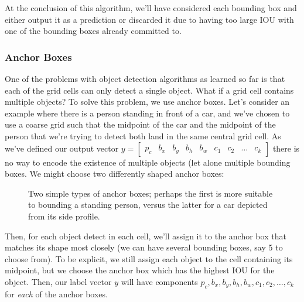 \documentclass[12pt]{article}
\begin{document}
At the conclusion of this algorithm, we'll have considered each bounding box and either output it as a prediction or discarded it due to having too large IOU with one of the bounding boxes already committed to.

\subsubsection{Anchor Boxes} One of the problems with object detection algorithms as learned so far is that each of the grid cells can only detect a single object. What if a grid cell contains multiple objects? To solve this problem, we use anchor boxes. Let's consider an example where there is a person standing in front of a car, and we've chosen to use a coarse grid such that the midpoint of the car and the midpoint of the person that we're trying to detect both land in the same central grid cell. As we've defined our output vector $y = \begin{bmatrix} p_c & b_x & b_y & b_h & b_w & c_1 & c_2 & \ldots & c_k \end{bmatrix}$ there is no way to encode the existence of multiple objects (let alone multiple bounding boxes. We might choose two differently shaped anchor boxes:
\begin{figure}[h]
  \centering
  \caption{\footnotesize Two simple types of anchor boxes; perhaps the first is more suitable to bounding a standing person, versus the latter for a car depicted from its side profile.}
\end{figure}
Then, for each object detect in each cell, we'll assign it to the anchor box that matches its shape most closely (we can have several bounding boxes, say 5 to choose from). To be explicit, we still assign each object to the cell containing its midpoint, but we choose the anchor box which has the highest IOU for the object. Then, our label vector $y$ will have components
$p_c, b_x, b_y, b_h, b_w, c_1, c_2, \ldots, c_k$ for \emph{each} of the anchor boxes.
\end{document}
